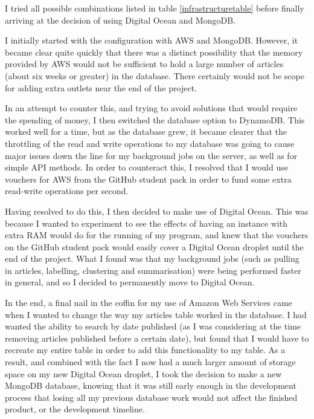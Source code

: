 \documentclass[12pt]{article}
\begin{document}
I tried all possible combinations listed in table \ref{infrastructuretable} before finally arriving at the decision of using Digital Ocean and MongoDB.

I initially started with the configuration with AWS and MongoDB. However, it became clear quite quickly that there was a distinct possibility that the memory provided by AWS would not be sufficient to hold a large number of articles (about six weeks or greater) in the database. There certainly would not be scope for adding extra outlets near the end of the project.

In an attempt to counter this, and trying to avoid solutions that would require the spending of money, I then switched the database option to DynamoDB. This worked well for a time, but as the database grew, it became clearer that the throttling of the read and write operations to my database was going to cause major issues down the line for my background jobs on the server, as well as for simple API methods. In order to counteract this, I resolved that I would use vouchers for AWS from the GitHub student pack in order to fund some extra read-write operations per second.

Having resolved to do this, I then decided to make use of Digital Ocean. This was because I wanted to experiment to see the effects of having an instance with extra RAM would do for the running of my program, and knew that the vouchers on the GitHub student pack would easily cover a Digital Ocean droplet until the end of the project. What I found was that my background jobs (such as pulling in articles, labelling, clustering and summarisation) were being performed faster in general, and so I decided to permanently move to Digital Ocean.

In the end, a final nail in the coffin for my use of Amazon Web Services came when I wanted to change the way my articles table worked in the database. I had wanted the ability to search by date published (as I was considering at the time removing articles published before a certain date), but found that I would have to recreate my entire table in order to add this functionality to my table. As a result, and combined with the fact I now had a much larger amount of storage space on my new Digital Ocean droplet, I took the decision to make a new MongoDB database, knowing that it was still early enough in the development process that losing all my previous database work would not affect the finished product, or the development timeline.
\end{document}
